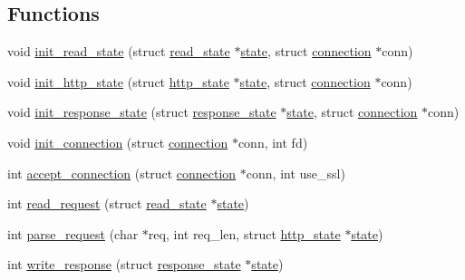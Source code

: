 \subsection*{Functions}
\begin{DoxyCompactItemize}
\item 
void \hyperlink{connection-handler_8h_af82ade39f14338cc7e30798368452364}{init\-\_\-read\-\_\-state} (struct \hyperlink{structread__state}{read\-\_\-state} $\ast$\hyperlink{http__parser_8c_adc6e5733fc3c22f0a7b2914188c49c90}{state}, struct \hyperlink{structconnection}{connection} $\ast$conn)
\item 
void \hyperlink{connection-handler_8h_ac4d0e53d85b747ae364c2d65686e9bc3}{init\-\_\-http\-\_\-state} (struct \hyperlink{structhttp__state}{http\-\_\-state} $\ast$\hyperlink{http__parser_8c_adc6e5733fc3c22f0a7b2914188c49c90}{state}, struct \hyperlink{structconnection}{connection} $\ast$conn)
\item 
void \hyperlink{connection-handler_8h_a15d9f343d7b0a10ca8fc2643821bbd2d}{init\-\_\-response\-\_\-state} (struct \hyperlink{structresponse__state}{response\-\_\-state} $\ast$\hyperlink{http__parser_8c_adc6e5733fc3c22f0a7b2914188c49c90}{state}, struct \hyperlink{structconnection}{connection} $\ast$conn)
\item 
void \hyperlink{connection-handler_8h_a9e4f80d42f79c16c463443629b480b75}{init\-\_\-connection} (struct \hyperlink{structconnection}{connection} $\ast$conn, int fd)
\item 
int \hyperlink{connection-handler_8h_a8b0520ef94350639d01d226c01f1e0d3}{accept\-\_\-connection} (struct \hyperlink{structconnection}{connection} $\ast$conn, int use\-\_\-ssl)
\item 
int \hyperlink{connection-handler_8h_a45111b168f72434544555058f1bdc047}{read\-\_\-request} (struct \hyperlink{structread__state}{read\-\_\-state} $\ast$\hyperlink{http__parser_8c_adc6e5733fc3c22f0a7b2914188c49c90}{state})
\item 
int \hyperlink{connection-handler_8h_af06abb9d08854f0672082140a01dd0f8}{parse\-\_\-request} (char $\ast$req, int req\-\_\-len, struct \hyperlink{structhttp__state}{http\-\_\-state} $\ast$\hyperlink{http__parser_8c_adc6e5733fc3c22f0a7b2914188c49c90}{state})
\item 
int \hyperlink{connection-handler_8h_ad3d7de1563a29af15a1bbef2fc7674c9}{write\-\_\-response} (struct \hyperlink{structresponse__state}{response\-\_\-state} $\ast$\hyperlink{http__parser_8c_adc6e5733fc3c22f0a7b2914188c49c90}{state})
\item 

\end{DoxyCompactItemize}
